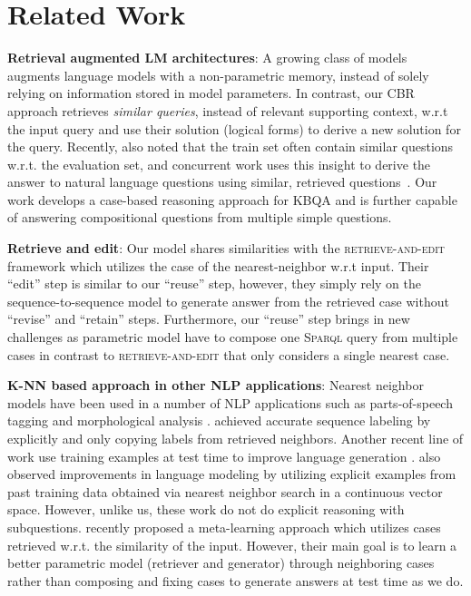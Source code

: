 \documentclass{article}
\newcommand{\spql}{\textsc{Sparql}\xspace}
\begin{document}
 

\section{Related Work}
\label{sec:related_work}
\textbf{Retrieval augmented LM architectures}: A growing class of models~\citep[e.g.,][]{guu2020realm,lewis2020retrieval} augments language models with a non-parametric memory, instead of solely relying on information stored in model parameters.
In contrast, our CBR approach retrieves \emph{similar queries}, instead of relevant supporting context, w.r.t the input query and use their solution (logical forms) to derive a new solution for the query. Recently, \cite{lewis2020question} also noted that the train set often contain similar questions w.r.t. the evaluation set, and concurrent work uses this insight to derive the answer to natural language questions using similar, retrieved questions~\cite{lewis2021paq}.
Our work develops a case-based reasoning approach for KBQA and is further capable of answering compositional questions from multiple simple questions.

\textbf{Retrieve and edit}: Our model shares similarities with the \textsc{retrieve-and-edit} framework \cite{hashimoto2018retrieve} which utilizes the case of the nearest-neighbor w.r.t input. 
Their ``edit'' step is similar to our ``reuse'' step, however, they simply rely on the sequence-to-sequence model to generate answer from the retrieved case without ``revise'' and ``retain'' steps. Furthermore, our ``reuse'' step brings in new challenges as parametric model have to compose one \spql query from multiple cases in contrast to \textsc{retrieve-and-edit} that only considers a single nearest case.

\textbf{K-NN based approach in other NLP applications}: Nearest neighbor models have been used in a number of NLP applications such as parts-of-speech tagging \cite{daelemans1996mbt} and morphological analysis \cite{bosch2007efficient}. \citet{wiseman-stratos-2019-label} achieved accurate sequence labeling by explicitly and only copying labels from retrieved neighbors. Another recent line of work use training examples at test time to improve language generation \cite{weston-etal-2018-retrieve,pandey-etal-2018-exemplar,cao-etal-2018-retrieve,peng-etal-2019-text}.
\citet{khandelwal2019generalization} also observed improvements in language modeling by utilizing explicit examples from past training data obtained via nearest neighbor search in a continuous vector space. However, unlike us, these work do not do explicit reasoning with subquestions.
\cite{hua2020retrieve} recently proposed a meta-learning approach which utilizes cases retrieved w.r.t. the similarity of the input. However, their main goal is to learn a better parametric model (retriever and generator) through neighboring cases rather than composing and fixing cases to generate answers at test time as we do.
\end{document}
